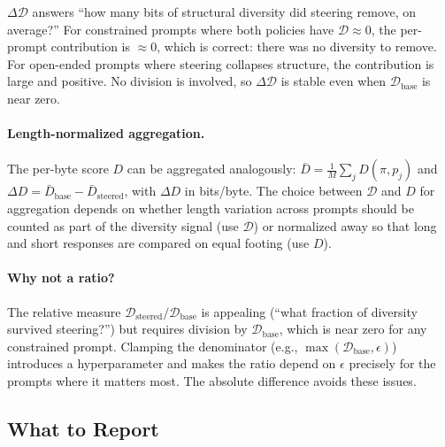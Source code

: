 \documentclass[11pt]{article}
\begin{document}
$\Delta\mathcal{D}$ answers ``how many bits of structural diversity did steering remove, on average?'' For constrained prompts where both policies have $\mathcal{D} \approx 0$, the per-prompt contribution is $\approx 0$, which is correct: there was no diversity to remove. For open-ended prompts where steering collapses structure, the contribution is large and positive. No division is involved, so $\Delta\mathcal{D}$ is stable even when $\mathcal{D}_{\mathrm{base}}$ is near zero.

\paragraph{Length-normalized aggregation.} The per-byte score $D$ can be aggregated analogously: $\bar{D} = \frac{1}{M}\sum_j D(\pi, p_j)$ and $\Delta D = \bar{D}_{\mathrm{base}} - \bar{D}_{\mathrm{steered}}$, with $\Delta D$ in bits/byte. The choice between $\mathcal{D}$ and $D$ for aggregation depends on whether length variation across prompts should be counted as part of the diversity signal (use $\mathcal{D}$) or normalized away so that long and short responses are compared on equal footing (use $D$).

\paragraph{Why not a ratio?} The relative measure $\mathcal{D}_{\mathrm{steered}} / \mathcal{D}_{\mathrm{base}}$ is appealing (``what fraction of diversity survived steering?'') but requires division by $\mathcal{D}_{\mathrm{base}}$, which is near zero for any constrained prompt. Clamping the denominator (e.g., $\max(\mathcal{D}_{\mathrm{base}}, \epsilon)$) introduces a hyperparameter and makes the ratio depend on $\epsilon$ precisely for the prompts where it matters most. The absolute difference avoids these issues.

\subsection{What to Report}
\end{document}
